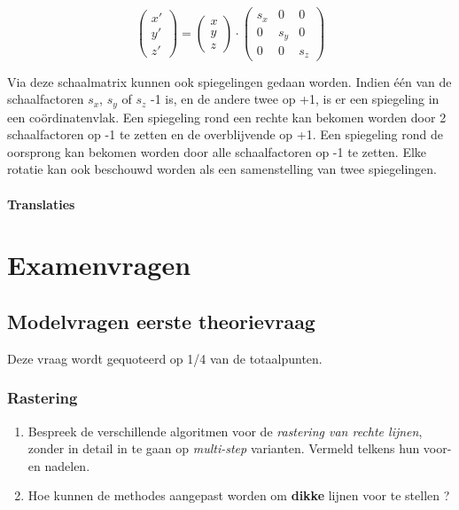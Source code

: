 \documentclass{report}
\begin{document}
	$$
		\begin{pmatrix}
			x' \\
			y' \\
			z'
		\end{pmatrix}
		= 
		\begin{pmatrix}
			x \\
			y \\
			z
		\end{pmatrix}
		\cdot
		\begin{pmatrix}
			s_x & 0 & 0 \\
			0 & s_y & 0 \\
			0 & 0  & s_z
		\end{pmatrix}
	$$

	Via deze schaalmatrix kunnen ook spiegelingen gedaan worden. Indien één van de schaalfactoren $s_x$, $s_y$ of $s_z$ -1 is, en de andere twee op +1, is er een spiegeling in een coördinatenvlak. Een spiegeling rond een rechte kan bekomen worden door 2 schaalfactoren op -1 te zetten en de overblijvende op +1. Een spiegeling rond de oorsprong kan bekomen worden door alle schaalfactoren op -1 te zetten.
	Elke rotatie kan ook beschouwd worden als een samenstelling van twee spiegelingen.

	\subsection{Translaties}

	\part{Examenvragen}
	\chapter{Modelvragen eerste theorievraag}
	Deze vraag wordt gequoteerd op 1/4 van de totaalpunten.
	
	\section{Rastering}
	\begin{enumerate}
		\item Bespreek de verschillende algoritmen voor de \textit{rastering van rechte lijnen}, zonder in detail in te gaan op \textit{multi-step} varianten. Vermeld telkens hun voor- en nadelen. 
		
		\item Hoe kunnen de methodes aangepast worden om \textbf{dikke} lijnen voor te stellen ? 
	\end{enumerate}
\end{document}
